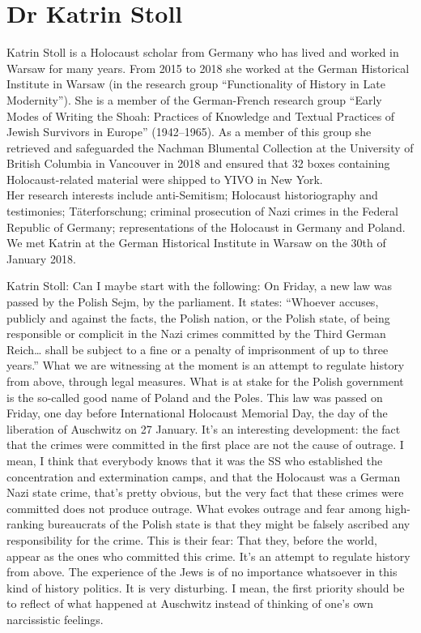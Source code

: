 \section{Dr Katrin Stoll} 

Katrin Stoll is a Holocaust scholar from Germany who has lived and worked in Warsaw for many years. From 2015 to 2018 she worked at the German Historical Institute in Warsaw (in the research group "`Functionality of History in Late Modernity"'). She is a member of the German-French research group "`Early Modes of Writing the Shoah: Practices of Knowledge and Textual Practices of Jewish Survivors in Europe"' (1942–1965). As a member of this group she retrieved and safeguarded the Nachman Blumental Collection at the University of British Columbia in Vancouver in 2018 and ensured that 32 boxes containing Holocaust-related material were shipped to YIVO in New York. \\
Her research interests include anti-Semitism; Holocaust historiography and testimonies; Täterforschung; criminal prosecution of Nazi crimes in the Federal Republic of Germany; representations of the Holocaust in Germany and Poland. \\
We met Katrin at the German Historical Institute in Warsaw on the 30th of January 2018. 

Katrin Stoll: Can I maybe start with the following: On Friday, a new law was passed by the Polish Sejm, by the parliament. It states: “Whoever accuses, publicly and against the facts, the Polish nation, or the Polish state, of being responsible or complicit in the Nazi crimes committed by the Third German Reich… shall be subject to a fine or a penalty of imprisonment of up to three years.” What we are witnessing at the moment is an attempt to regulate history from above, through legal measures.  What is at stake for the Polish government is the so-called good name of Poland and the Poles. This law was passed on Friday, one day before International Holocaust Memorial Day, the day of the liberation of Auschwitz on 27 January. It’s an interesting development: the fact that the crimes were committed in the first place are not the cause of outrage. I mean, I think that everybody knows that it was the SS who established the concentration and extermination camps, and that the Holocaust was a German Nazi state crime, that’s pretty obvious, but the very fact that these crimes were committed does not produce outrage. What evokes outrage and fear among high-ranking bureaucrats of the Polish state is that they might be falsely ascribed any responsibility for the crime. This is their fear: That they, before the world, appear as the ones who committed this crime. It’s an attempt to regulate history from above. The experience of the Jews is of no importance whatsoever in this kind of history politics. It is very disturbing. I mean, the first priority should be to reflect of what happened at Auschwitz instead of thinking of one’s own narcissistic feelings. 

